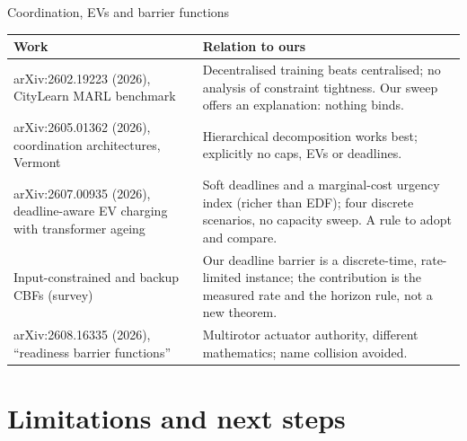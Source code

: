 \documentclass[aspectratio=169,10pt]{beamer}
\begin{document}
\begin{frame}{Coordination, EVs and barrier functions}
\small
\begin{tabularx}{\textwidth}{@{}>{\raggedright\arraybackslash}p{4.1cm}>{\raggedright\arraybackslash}X@{}}
\toprule
Work & Relation to ours \\
\midrule
arXiv:2602.19223 (2026), CityLearn MARL benchmark & Decentralised training beats centralised; no analysis of constraint tightness. Our sweep offers an explanation: nothing binds. \\
arXiv:2605.01362 (2026), coordination architectures, Vermont & Hierarchical decomposition works best; explicitly no caps, EVs or deadlines. \\
arXiv:2607.00935 (2026), deadline-aware EV charging with transformer ageing & Soft deadlines and a marginal-cost urgency index (richer than EDF); four discrete scenarios, no capacity sweep. A rule to adopt and compare. \\
Input-constrained and backup CBFs (survey) & Our deadline barrier is a discrete-time, rate-limited instance; the contribution is the measured rate and the horizon rule, not a new theorem. \\
arXiv:2608.16335 (2026), ``readiness barrier functions'' & Multirotor actuator authority, different mathematics; name collision avoided. \\
\bottomrule
\end{tabularx}
\end{frame}

\section{Limitations and next steps}
\end{document}

